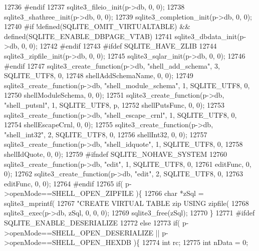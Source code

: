 \begin{DoxyCode}
{12736 \textcolor{preprocessor}{#endif}
12737     sqlite3_fileio_init(p->db, 0, 0);
12738     sqlite3_shathree_init(p->db, 0, 0);
12739     sqlite3_completion_init(p->db, 0, 0);
12740 \textcolor{preprocessor}{#if !defined(SQLITE\_OMIT\_VIRTUALTABLE) && defined(SQLITE\_ENABLE\_DBPAGE\_VTAB)}
12741     sqlite3\_dbdata\_init(p->db, 0, 0);
12742 \textcolor{preprocessor}{#endif}
12743 \textcolor{preprocessor}{#ifdef SQLITE\_HAVE\_ZLIB}
12744     sqlite3\_zipfile\_init(p->db, 0, 0);
12745     sqlite3\_sqlar\_init(p->db, 0, 0);
12746 \textcolor{preprocessor}{#endif}
12747     sqlite3_create_function(p->db, \textcolor{stringliteral}{"shell\_add\_schema"}, 3, SQLITE_UTF8, 0,
12748                             shellAddSchemaName, 0, 0);
12749     sqlite3_create_function(p->db, \textcolor{stringliteral}{"shell\_module\_schema"}, 1, SQLITE_UTF8, 0,
12750                             shellModuleSchema, 0, 0);
12751     sqlite3_create_function(p->db, \textcolor{stringliteral}{"shell\_putsnl"}, 1, SQLITE_UTF8, p,
12752                             shellPutsFunc, 0, 0);
12753     sqlite3_create_function(p->db, \textcolor{stringliteral}{"shell\_escape\_crnl"}, 1, SQLITE_UTF8, 0,
12754                             shellEscapeCrnl, 0, 0);
12755     sqlite3_create_function(p->db, \textcolor{stringliteral}{"shell\_int32"}, 2, SQLITE_UTF8, 0,
12756                             shellInt32, 0, 0);
12757     sqlite3_create_function(p->db, \textcolor{stringliteral}{"shell\_idquote"}, 1, SQLITE_UTF8, 0,
12758                             shellIdQuote, 0, 0);
12759 \textcolor{preprocessor}{#ifndef SQLITE\_NOHAVE\_SYSTEM}
12760     sqlite3_create_function(p->db, \textcolor{stringliteral}{"edit"}, 1, SQLITE_UTF8, 0,
12761                             editFunc, 0, 0);
12762     sqlite3_create_function(p->db, \textcolor{stringliteral}{"edit"}, 2, SQLITE_UTF8, 0,
12763                             editFunc, 0, 0);
12764 \textcolor{preprocessor}{#endif}
12765     \textcolor{keywordflow}{if}( p->openMode==SHELL_OPEN_ZIPFILE )\{
12766       \textcolor{keywordtype}{char} *zSql = sqlite3_mprintf(
12767          \textcolor{stringliteral}{"CREATE VIRTUAL TABLE zip USING zipfile(%
12768       sqlite3_exec(p->db, zSql, 0, 0, 0);
12769       sqlite3_free(zSql);
12770     \}
12771 \textcolor{preprocessor}{#ifdef SQLITE\_ENABLE\_DESERIALIZE}
12772     \textcolor{keywordflow}{else}
12773     \textcolor{keywordflow}{if}( p->openMode==SHELL_OPEN_DESERIALIZE || p->openMode==SHELL_OPEN_HEXDB )\{
12774       \textcolor{keywordtype}{int} rc;
12775       \textcolor{keywordtype}{int} nData = 0;
}}
\end{DoxyCode}
